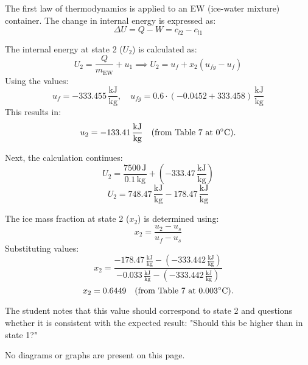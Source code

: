 The first law of thermodynamics is applied to an EW (ice-water mixture) container. The change in internal energy is expressed as:  
\[
\Delta U = Q - W = c_{l2} - c_{l1}
\]

The internal energy at state 2 (\( U_2 \)) is calculated as:  
\[
U_2 = \frac{Q}{m_{\text{EW}}} + u_1 \implies U_2 = u_f + x_2 (u_{fg} - u_f)
\]  
Using the values:  
\[
u_f = -333.455 \, \frac{\text{kJ}}{\text{kg}}, \quad u_{fg} = 0.6 \cdot (-0.0452 + 333.458) \, \frac{\text{kJ}}{\text{kg}}
\]  
This results in:  
\[
u_2 = -133.41 \, \frac{\text{kJ}}{\text{kg}} \quad \text{(from Table 7 at \( 0^\circ\text{C} \))}.
\]

Next, the calculation continues:  
\[
U_2 = \frac{7500 \, \text{J}}{0.1 \, \text{kg}} + (-333.47 \, \frac{\text{kJ}}{\text{kg}})
\]  
\[
U_2 = 748.47 \, \frac{\text{kJ}}{\text{kg}} - 178.47 \, \frac{\text{kJ}}{\text{kg}}
\]

The ice mass fraction at state 2 (\( x_2 \)) is determined using:  
\[
x_2 = \frac{u_2 - u_s}{u_f - u_s}
\]  
Substituting values:  
\[
x_2 = \frac{-178.47 \, \frac{\text{kJ}}{\text{kg}} - (-333.442 \, \frac{\text{kJ}}{\text{kg}})}{-0.033 \, \frac{\text{kJ}}{\text{kg}} - (-333.442 \, \frac{\text{kJ}}{\text{kg}})}
\]  
\[
x_2 = 0.6449 \quad \text{(from Table 7 at \( 0.003^\circ\text{C} \))}.
\]

The student notes that this value should correspond to state 2 and questions whether it is consistent with the expected result:  
"Should this be higher than in state 1?"  

No diagrams or graphs are present on this page.